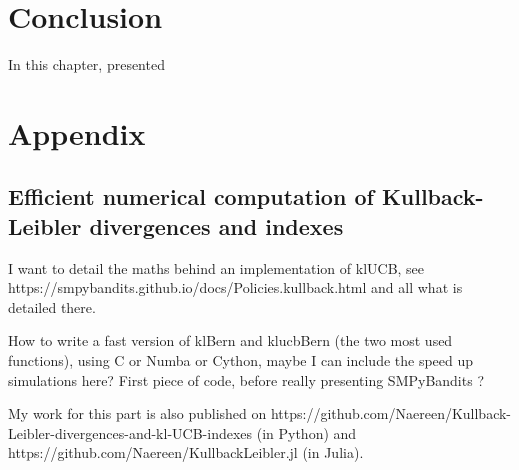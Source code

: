\section{Conclusion}
\label{sec:2:conclusion}

In this chapter, presented 




\section{Appendix}
\label{sec:2:appendix}


\subsection{Efficient numerical computation of Kullback-Leibler divergences and \klUCB{} indexes}


I want to detail the maths behind an implementation of klUCB, see https://smpybandits.github.io/docs/Policies.kullback.html and all what is detailed there.

How to write a fast version of klBern and klucbBern (the two most used functions), using C or Numba or Cython, maybe I can include the speed up simulations here? First piece of code, before really presenting SMPyBandits ?

My work for this part is also published on https://github.com/Naereen/Kullback-Leibler-divergences-and-kl-UCB-indexes
(in Python) and https://github.com/Naereen/KullbackLeibler.jl (in Julia).

